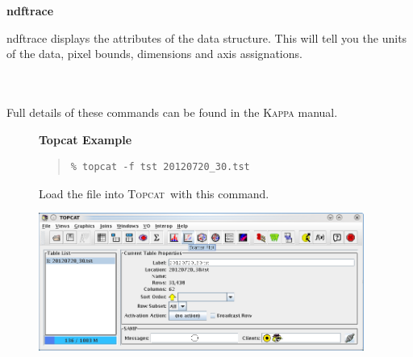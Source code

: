 \documentclass[twoside,11pt]{article}
\newcommand{\htmladdnormallink}[2]{#1}
\newenvironment{latexonly}{}{}
\newcommand{\xref}[3]{#1}
\renewcommand{\_}{\texttt{\symbol{95}}}
\newenvironment{fmpage}[1]{\begin{lrbox}{\fmbox}\begin{minipage}{#1}}{\end{minipage}\end{lrbox}\fbox{\usebox{\fmbox}}}
\newenvironment{myquote}{\begin{quote}\begin{small}}{\end{small}\end{quote}}
\newcommand{\topcat}{\htmladdnormallink{\textsc{Topcat}}{http://www.starlink.ac.uk/topcat}}
\newcommand{\task}[1]{\textsf{#1}}
\begin{document}
\begin{minipage}[t]{0.12\linewidth}
\textbf{ndftrace}
\end{minipage}
\begin{minipage}[t]{0.85\linewidth}
\task{ndftrace} displays the attributes of the data structure. This will tell
you the units of the data, pixel bounds, dimensions and axis assignations.\\
\end{minipage}
\\ \\
Full details of these commands can be found in the \xref{\textsc{Kappa} manual}{sun95}{}.

\begin{latexonly}
\begin{figure}[ht!]
\begin{center}
\begin{fmpage}{0.95\linewidth}
\vspace{0.2cm}
\textbf{ Topcat Example}

\vspace{0.5cm}

\begin{minipage}[c]{0.6\linewidth}

\begin{myquote}
\begin{verbatim}
% topcat -f tst 20120720_30.tst
\end{verbatim}
\end{myquote}
\end{minipage}
\hspace{0.3cm}
\begin{minipage}[c]{0.32\linewidth}
Load the file into \topcat\ with this command.
\end{minipage}

\vspace{0.5cm}

\begin{minipage}[c]{0.6\linewidth}
\centering
\includegraphics[width=0.95\textwidth]{sc21_topcat1}


\end{minipage}
\end{fmpage}
\end{center}
\end{figure}
\end{latexonly}
\end{document}
